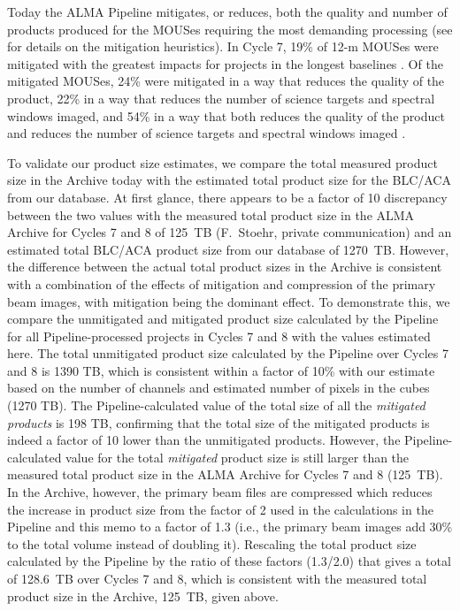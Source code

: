 \documentclass[preprint]{aastex631}
\begin{document}
Today the ALMA Pipeline mitigates, or reduces, both the quality and number of products produced for the MOUSes requiring the most demanding processing (see \citealt{Hunter2023TheHeuristics} for details on the mitigation heuristics). In Cycle 7, 19\% of 12-m MOUSes were mitigated with the greatest impacts for projects in the longest baselines \citep{Kepley2023Mitigation}. Of the mitigated MOUSes, 24\% were mitigated in a way that reduces the quality of the product, 22\% in a way that reduces the number of science targets and spectral windows imaged, and 54\% in a way that both reduces the quality of the product and reduces the number of science targets and spectral windows imaged \citep{Kepley2023Mitigation}.  

To validate our product size estimates, we compare the total measured product size in the Archive today with the estimated total product size for the BLC/ACA from our database. At first glance, there appears to be a factor of 10 discrepancy between the two values with the measured total product size  in the ALMA Archive for Cycles 7 and 8 of 125~TB (F.\ Stoehr, private communication) and an estimated total BLC/ACA product size from our database of 1270~TB. However, the difference between the actual total product sizes in the Archive is consistent with a combination of the effects of mitigation and compression of the primary beam images, with mitigation being the dominant effect. To demonstrate this, we compare the unmitigated and mitigated product size calculated by the Pipeline for all Pipeline-processed projects in Cycles 7 and 8 with the values estimated here. The total unmitigated product size calculated by the Pipeline over Cycles 7 and 8 is 1390 TB, which is consistent within a factor of 10\% with our estimate based on the number of channels and estimated number of pixels in the cubes (1270 TB). The Pipeline-calculated value of the total size of all the {\it mitigated products} is 198 TB,  confirming that the total size of the mitigated products is indeed a factor of 10 lower than the unmitigated products. However, the Pipeline-calculated value for the total {\it mitigated} product size is still larger than the measured total product size in the ALMA Archive for Cycles 7 and 8 (125~TB). In the Archive, however, the primary beam files are compressed which reduces the increase in product size from the factor of 2 used in the calculations in the Pipeline and this memo to a factor of 1.3 (i.e., the primary beam images add 30\% to the total volume instead of doubling it). Rescaling the total product size calculated by the Pipeline by the ratio of these factors (1.3/2.0) that gives a total of 128.6~TB over Cycles 7 and 8, which is consistent with the measured total product size in the Archive, 125~TB,  given above. 
\end{document}
